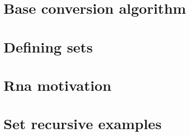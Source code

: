 \section*{Base conversion algorithm}

\vfill
\section*{Defining sets}

\vfill
\section*{Rna motivation}

\vfill
\section*{Set recursive examples}

\vfill
